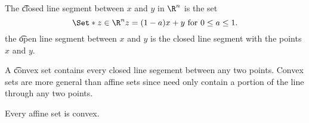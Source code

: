



The \t{closed line segment} between $x$ and $y$ in $\R^n$ is the set
$$
  \Set*{z \in \R^n}{z = (1-a) x + y \text{ for } 0 \leq a \leq 1}.
$$
the \t{open line segment} between $x$ and $y$ is the closed line segment with the points $x$ and $y$.

A \t{convex set} contains every closed line segement between any two points.
Convex sets are more general than affine sets since need only contain a portion of the line through any two points.

\begin{prop}
  Every affine set is convex.
\end{prop}

%
%
%
%
%
%
%
%
%
%
%
%

